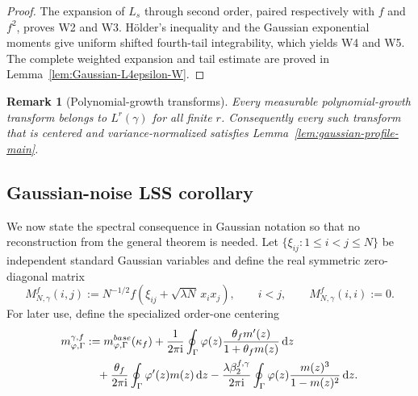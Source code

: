\documentclass[10pt,a4paper]{amsart}
\newtheorem{remark}[theorem]{Remark}
\newcommand{\ii}{\mathrm i}
\newcommand{\dd}{\mathrm d}
\begin{document}
\begin{proof}
The expansion of $L_s$ through second order, paired respectively with $f$ and
$f^2$, proves W2 and W3.  H\"older's inequality and the Gaussian exponential
moments give uniform shifted fourth-tail integrability, which yields W4 and
W5.  The complete weighted expansion and tail estimate are proved in
Lemma~\ref{lem:Gaussian-L4epsilon-W}.
\end{proof}

\begin{remark}[Polynomial-growth transforms]
Every measurable polynomial-growth transform belongs to $L^r(\gamma)$ for
all finite $r$.  Consequently every such transform that is centered and
variance-normalized satisfies Lemma~\ref{lem:gaussian-profile-main}.
\end{remark}

\subsection{Gaussian-noise LSS corollary}
\label{subsec:gaussian-LSS-main}

We now state the spectral consequence in Gaussian notation so that no
reconstruction from the general theorem is needed.  Let
$\{\xi_{ij}:1\le i<j\le N\}$ be independent standard Gaussian variables and
define the real symmetric zero-diagonal matrix
\begin{equation}\label{eq:Gaussian-matrix-main}
 M_{N,\gamma}^f(i,j)
 :=N^{-1/2}f\!\left(\xi_{ij}+\sqrt{\lambda N}\,x_ix_j\right),
 \qquad i<j,
 \qquad
 M_{N,\gamma}^f(i,i):=0.
\end{equation}
For later use, define the specialized order-one centering
\begin{align}
 m_{\varphi,\Gamma}^{\gamma,f}
 &:={m}_{\varphi,\Gamma}^{\rm base}(\kappa_f)
 +\frac{1}{2\pi\ii}\oint_\Gamma
 \varphi(z)\frac{\theta_fm'(z)}{1+\theta_fm(z)}\,\dd z
 \notag\\
 &\quad
 +\frac{\theta_f}{2\pi\ii}\oint_\Gamma
 \varphi'(z)m(z)\,\dd z
 -\frac{\lambda\beta_2^{f,\gamma}}{2\pi\ii}\oint_\Gamma
 \varphi(z)\frac{m(z)^3}{1-m(z)^2}\,\dd z.
 \label{eq:Gaussian-centering-main}
\end{align}
\end{document}
